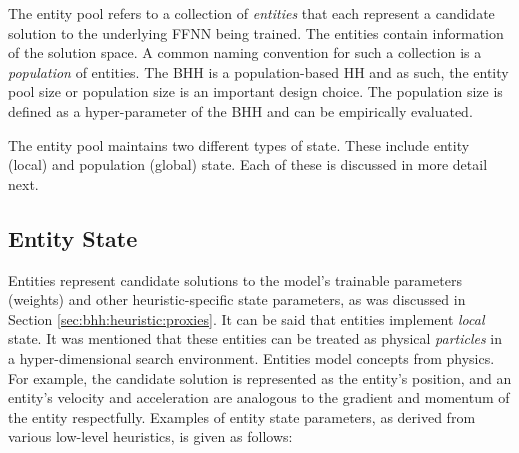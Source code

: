 The entity pool refers to a collection of \textit{entities} that each represent a candidate solution to the underlying \acs{FFNN} being trained. The entities contain information of the solution space. A common naming convention for such a collection is a \textit{population} of entities. The \acs{BHH} is a population-based \acs{HH} and as such, the entity pool size or population size is an important design choice. The population size is defined as a hyper-parameter of the \acs{BHH} and can be empirically evaluated.

The entity pool maintains two different types of state. These include entity (local) and population (global) state. Each of these is discussed in more detail next.

\subsection{Entity State}\label{sec:bhh:entity_pool:entity_state}

Entities represent candidate solutions to the model's trainable parameters (weights) and other heuristic-specific state parameters, as was discussed in Section \ref{sec:bhh:heuristic:proxies}. It can be said that entities implement \textit{local} state. It was mentioned that these entities can be treated as physical \textit{particles} in a hyper-dimensional search environment. Entities model concepts from physics. For example, the candidate solution is represented as the entity's position, and an entity's velocity and acceleration are analogous to the gradient and momentum of the entity respectfully. Examples of entity state parameters, as derived from various low-level heuristics, is given as follows:

